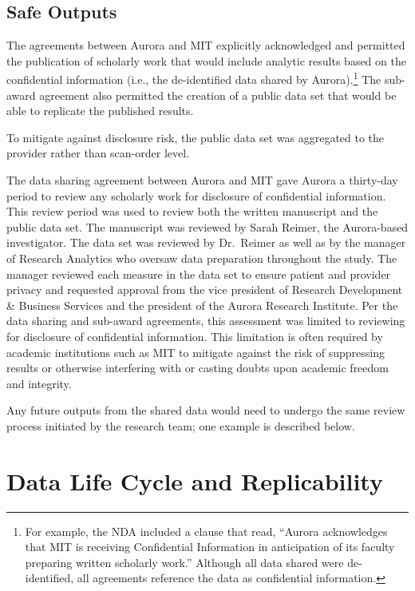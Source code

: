 \hypertarget{safe-outputs-3}{%
\subsection{Safe Outputs}\label{safe-outputs-3}}

The agreements between Aurora and MIT explicitly acknowledged and permitted the publication of scholarly work that would include analytic results based on the confidential information (i.e., the de-identified data shared by Aurora).\footnote{For example, the NDA included a clause that read, ``Aurora acknowledges that MIT is receiving Confidential Information in anticipation of its faculty preparing written scholarly work.'' Although all data shared were de-identified, all agreements reference the data as confidential information.} The sub-award agreement also permitted the creation of a public data set that would be able to replicate the published results.

To mitigate against disclosure risk, the public data set was aggregated to the provider rather than scan-order level.

The data sharing agreement between Aurora and MIT gave Aurora a thirty-day period to review any scholarly work for disclosure of confidential information. This review period was used to review both the written manuscript and the public data set. The manuscript was reviewed by Sarah Reimer, the Aurora-based investigator. The data set was reviewed by Dr.~Reimer as well as by the manager of Research Analytics who oversaw data preparation throughout the study. The manager reviewed each measure in the data set to ensure patient and provider privacy and requested approval from the vice president of Research Development \& Business Services and the president of the Aurora Research Institute. Per the data sharing and sub-award agreements, this assessment was limited to reviewing for disclosure of confidential information. This limitation is often required by academic institutions such as MIT to mitigate against the risk of suppressing results or otherwise interfering with or casting doubts upon academic freedom and integrity.

Any future outputs from the shared data would need to undergo the same review process initiated by the research team; one example is described below.

\hypertarget{data-life-cycle-and-replicability-2}{%
\section{Data Life Cycle and Replicability}\label{data-life-cycle-and-replicability-2}}


